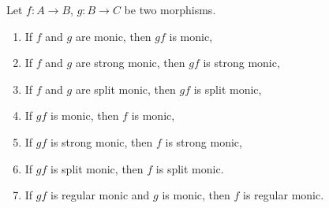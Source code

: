 Let $f\colon A\to B$, $g\colon B\to C$ be two morphisms.
\begin{enumerate}[label=(\alph*)]
	\item If $f$ and $g$ are monic, then $gf$ is monic,
	\item If $f$ and $g$ are strong monic, then $gf$ is strong monic,
	\item If $f$ and $g$ are split monic, then $gf$ is split monic,
	\item If  $gf$ is monic, then $f$ is monic,
	\item If  $gf$ is strong monic, then $f$ is strong monic,
	\item If  $gf$ is split monic, then $f$ is split monic.
	\item If $gf$ is regular monic and $g$ is monic, then $f$ is regular monic.
\end{enumerate}

